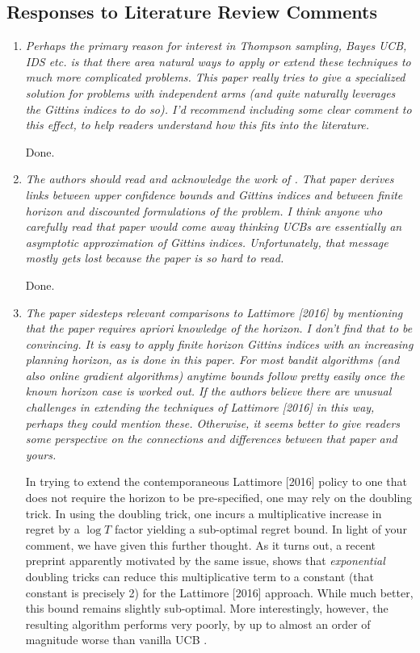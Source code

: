 \documentclass[11pt]{article}
\newcommand{\1}{\ensuremath{\mathbf{1}}} %
\theoremstyle{thm-sf}
\begin{document}
	
	\subsection{Responses to Literature Review Comments}
	
	\begin{enumerate}
		\item {\it Perhaps the primary reason for interest in Thompson sampling, Bayes UCB, IDS etc. is that there area natural ways to apply or extend these techniques to much more complicated problems. This paper really tries to give a specialized solution for problems with independent arms (and quite naturally leverages the Gittins indices to do so). I'd recommend including some clear comment to this effect, to help readers understand how this fits into the literature.}
		
		Done. 
		
		\item {\it The authors should read and acknowledge the work of \cite{chang1987optimal}. That paper derives links between upper confidence bounds and Gittins indices and between finite horizon and discounted formulations of the problem. I think anyone who carefully read that paper would come away thinking UCBs are essentially an asymptotic approximation of Gittins indices. Unfortunately, that message mostly gets lost because the paper is so hard to read.}
		
		Done. 
		
		\item {\it The paper sidesteps relevant comparisons to Lattimore [2016] by mentioning that the paper requires apriori knowledge of the horizon. I don't find that to be convincing. It is easy to apply finite horizon Gittins indices with an increasing planning horizon, as is done in this paper. For most bandit algorithms (and also online gradient algorithms) anytime bounds follow pretty easily once the known horizon case is worked out. If the authors believe there are unusual challenges in extending the techniques of Lattimore [2016] in this way, perhaps they could mention these. Otherwise, it seems better to give readers some perspective on the connections and differences between that paper and yours.
		}
		
In trying to extend the contemporaneous Lattimore [2016] policy to one that does not require the horizon to be pre-specified, one may rely on the doubling trick. In using the doubling trick, one incurs a multiplicative increase in regret by a $\log T$ factor yielding a sub-optimal regret bound. In light of your comment, we have given this further thought. As it turns out, a recent preprint \citep{besson2018doubling} apparently motivated by the same issue, shows that {\em exponential} doubling tricks can reduce this multiplicative term to a constant (that constant is precisely 2) for the Lattimore [2016] approach. While much better, this bound remains slightly sub-optimal. More interestingly, however, the resulting algorithm performs very poorly, by up to almost an order of magnitude worse than vanilla UCB \citep{besson2018doubling}.
		
	\end{enumerate}
	
\end{document}
